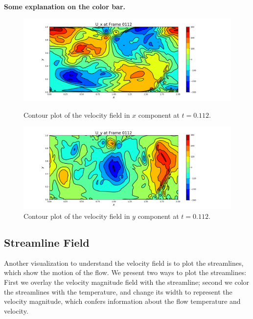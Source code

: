 \documentclass[11pt]{article} %
\begin{document}
\textbf{Some explanation on the color bar.}
\begin{figure}[h!]
\centering
\hspace*{-0.25in}
\includegraphics[width=1.2\textwidth]{velocity_x.png}
\caption{Contour plot of the velocity field in $x$ component at $t=0.112$.}
\hspace*{-0.25in}
\includegraphics[width=1.2\textwidth]{velocity_y.png}
\caption{Contour plot of the velocity field in $y$ component at $t=0.112$.}
\end{figure}
\newpage

\subsection{Streamline Field}
Another visualization to understand the velocity field is to plot the streamlines, which show the motion of the flow. We present two ways to plot the streamlines: First we overlay the velocity magnitude field with the streamline; second we color the streamlines with the temperature, and change its width to represent the velocity magnitude, which confers information about the flow temperature and velocity.
\end{document}
